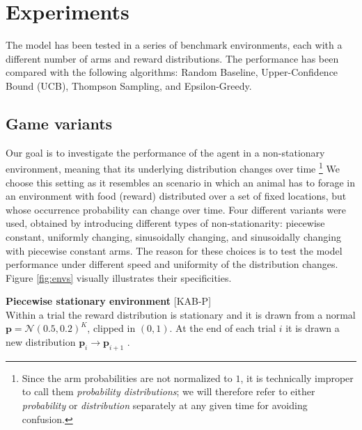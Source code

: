 \section{Experiments}

The model has been tested in a series of benchmark environments, each with a different number of arms and reward distributions. The performance has been compared with the following algorithms: Random Baseline, Upper-Confidence Bound (UCB), Thompson Sampling, and Epsilon-Greedy.

\subsection{Game variants}\label{sec:envs}

\noindent Our goal is to investigate the performance of the agent in a non-stationary environment, meaning that its underlying distribution changes over time \footnote{Since the arm probabilities are not normalized to $1$, it is
technically improper to call them \textit{probability distributions}; we will therefore refer to either \textit{probability} or \textit{distribution} separately at any given time for avoiding confusion.}
We choose this setting as it resembles an scenario in which an animal has to forage in an environment with food (reward) distributed over a set of fixed locations, but whose occurrence probability can change over time.
Four different variants were used, obtained by introducing different types of non-stationarity: piecewise constant, uniformly changing, sinusoidally changing, and sinusoidally changing with piecewise constant arms.
The reason for these choices is to test the model performance under different speed and uniformity of the distribution changes.
Figure \ref{fig:envs} visually illustrates their specificities.

\hfill \break
\noindent \textbf{Piecewise stationary environment} [\textsc{KAB-P}]\\ Within a trial the reward distribution is stationary and it is drawn from a normal $\mathbf{p}=\mathcal{N}(0.5, 0.2)^{K}$, clipped in $(0, 1)$. At the end of each trial $i$ it is drawn a new distribution $\mathbf{\mathbf{p}}_{i} \to \mathbf{\mathbf{p}}_{i+1}$ \cite{qiForcedExplorationBandit2023}.

